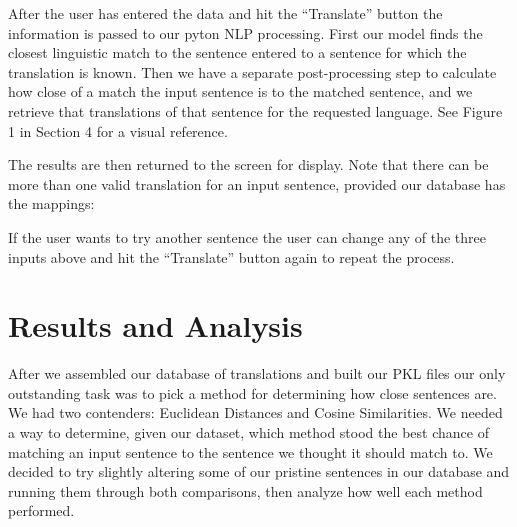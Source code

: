 \documentclass[runningheads]{llncs}
\begin{document}
After the user has entered the data and hit the ``Translate'' button the information is passed to our pyton NLP processing. First our model finds the closest linguistic match to the sentence entered to a sentence for which the translation is known. Then we have a separate post-processing step to calculate how close of a match the input sentence is to the matched sentence, and we retrieve that translations of that sentence for the requested language. See Figure 1 in Section 4 for a visual reference.

The results are then returned to the screen for display. Note that there can be more than one valid translation for an input sentence, provided our database has the mappings:

	\begin{minipage}{\linewidth}
		\begin{center}
  			 \noindent{}
			\label{fig:Display Translations}
			\vspace*{1cm}
		\end{center}
	\end{minipage}
	\afterpage{\clearpage}
If the user wants to try another sentence the user can change any of the three inputs above and hit the ``Translate'' button again to repeat the process.

	\section{Results and Analysis}
	After we assembled our database of translations and built our PKL files our only outstanding task was to pick a method for determining how close sentences are. We had two contenders: Euclidean Distances and Cosine Similarities. We needed a way to determine, given our dataset, which method stood the best chance of matching an input sentence to the sentence we thought it should match to. We decided to try slightly altering some of our pristine sentences in our database and running them through both comparisons, then analyze how well each method performed.
\end{document}
